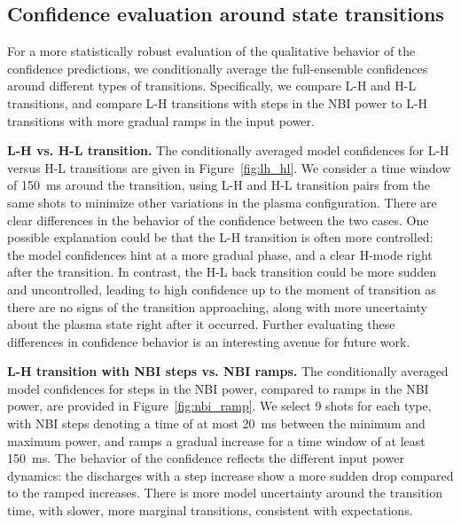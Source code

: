 \subsection{Confidence evaluation around state transitions}\label{sec:conditional_average}
For a more statistically robust evaluation of the qualitative behavior of the confidence predictions, we conditionally average the full-ensemble confidences around different types of transitions. Specifically, we compare L-H and H-L transitions, and compare L-H transitions with steps in the NBI power to L-H transitions with more gradual ramps in the input power.

\textbf{L-H vs. H-L transition.} The conditionally averaged model confidences for L-H versus H-L transitions are given in Figure~\ref{fig:lh_hl}. We consider a time window of \SI{150}{\milli\second} around the transition, using L-H and H-L transition pairs from the same shots to minimize other variations in the plasma configuration. There are clear differences in the behavior of the confidence between the two cases. One possible explanation could be that the L-H transition is often more controlled: the model confidences hint at a more gradual phase, and a clear H-mode right after the transition. In contrast, the H-L back transition could be more sudden and uncontrolled, leading to high confidence up to the moment of transition as there are no signs of the transition approaching, along with more uncertainty about the plasma state right after it occurred. Further evaluating these differences in confidence behavior is an interesting avenue for future work.




\textbf{L-H transition with NBI steps vs. NBI ramps.} The conditionally averaged model confidences for steps in the NBI power, compared to ramps in the NBI power, are provided in Figure~\ref{fig:nbi_ramp}. We select 9 shots for each type, with NBI steps denoting a time of at most \SI{20}{\milli\second} between the minimum and maximum power, and ramps a gradual increase for a time window of at least \SI{150}{\milli\second}. The behavior of the confidence reflects the different input power dynamics: the discharges with a step increase show a more sudden drop compared to the ramped increases. There is more model uncertainty around the transition time, with slower, more marginal transitions, consistent with expectations.


